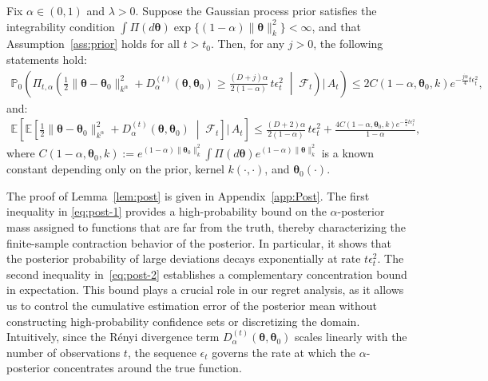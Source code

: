 \documentclass[final,12pt]{colt2026} %
\begin{document}
\begin{lemma}\label{lem:post}
Fix $\alpha\in(0,1)$ and $\lambda>0$. Suppose the Gaussian process prior satisfies the integrability condition
$\int \Pi(d\pmb \theta)\exp\{(1-\alpha)\|\pmb \theta\|_k^2\}<\infty$,
and that Assumption~\ref{ass:prior} holds for all $t>t_0$. Then, for any $j>0$, the following statements hold:
\begin{align}\label{eq:post-1}
\mathbb{P}_{0}\!\left(
\Pi_{t,\alpha}\!\left(
\frac{1}{2}\|\pmb \theta-\pmb \theta_0\|_{k^\alpha}^2
+
D_{\alpha}^{(t)}(\pmb \theta,\pmb \theta_0)
\ge
\frac{(D+j)\alpha}{2(1-\alpha)}\,t\epsilon_t^2
\;\middle|\;
\mathcal{F}_{t}
\right)
\Big|\,
A_t
\right)
\le
2C(1-\alpha,\pmb\theta_0,k)
e^{-\frac{j\alpha}{4}t\epsilon_t^2},
\end{align}
and:
\begin{align}\label{eq:post-2}
\mathbb{E}\!\left[
\mathbb{E}\!\left[
\frac{1}{2}\|\pmb \theta-\pmb \theta_0\|_{k^\alpha}^2
+
D_{\alpha}^{(t)}(\pmb \theta,\pmb \theta_0)
\;\middle|\;
\mathcal{F}_{t}
\right]
\Big|\,
A_t
\right]
\le
\frac{(D+2)\alpha}{2(1-\alpha)}\,t\epsilon_t^2
+
\frac{4C(1-\alpha,\pmb\theta_0,k)
e^{-\frac{\alpha}{4}t\epsilon_t^2}}{1-\alpha},
\end{align}
where $C(1-\alpha,\pmb\theta_0,k):= e^{{ (1-\alpha)} \|\pmb \theta_0\|_k^2} \int \Pi(d\pmb \theta)e^{{ (1-\alpha)} \|\pmb \theta\|_k^2}$ is a known constant depending only on the prior, kernel $k(\cdot, \cdot)$, and $\pmb\theta_0(\cdot)$.
\end{lemma}

The proof of Lemma~\ref{lem:post} is given in Appendix~\ref{app:Post}. The first inequality in \eqref{eq:post-1} provides a high-probability bound on the $\alpha$-posterior mass assigned to functions that are far from the truth, thereby characterizing the finite-sample contraction behavior of the posterior. In particular, it shows that the posterior probability of large deviations decays exponentially at rate $t\epsilon_t^2$. The second inequality in~\eqref{eq:post-2} establishes a complementary concentration bound in expectation. This bound plays a crucial role in our regret analysis, as it allows us to control the cumulative estimation error of the posterior mean without constructing high-probability confidence sets or discretizing the domain. Intuitively, since the R\'enyi divergence term $D_{\alpha}^{(t)}(\pmb \theta,\pmb \theta_0)$ scales linearly with the number of observations $t$, the sequence $\epsilon_t$ governs the rate at which the $\alpha$-posterior concentrates around the true function.
\end{document}
